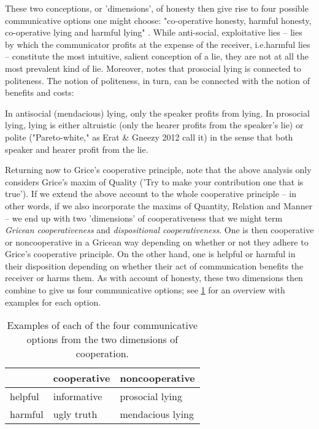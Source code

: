 These two conceptions, or 'dimensions', of honesty then give rise to four possible communicative options one might choose: "co-operative honesty, harmful honesty, co-operative lying and harmful lying" \citep[p.~45]{Dor17}.
While anti-social, exploitative lies -- lies by which the communicator profits at the expense of the receiver, i.e.\@ harmful lies -- constitute the most intuitive, salient conception of a lie, they are not at all the most prevalent kind of lie. Moreover, \citet{Meibauer18} notes that prosocial lying is connected to politeness. The notion of politeness, in turn, can be connected with the notion of benefits and costs:
\begin{quoting}
    In antisocial (mendacious) lying, only the speaker profits from lying. In prosocial lying, lying is either altruistic (only the hearer profits from the speaker's lie) or polite ("Pareto-white," as Erat \& Gneezy 2012 call it) in the sense that both speaker and hearer profit from the lie.
    \hfill \citep[p.~371]{Meibauer18}
\end{quoting}

Returning now to Grice's cooperative principle, note that the above analysis only considers Grice's maxim of Quality ('Try to make your contribution one that is true'). If we extend the above account to the whole cooperative principle -- in other words, if we also incorporate the maxims of Quantity, Relation and Manner -- we end up with two 'dimensions' of cooperativeness that we might term \emph{Gricean cooperativeness} and \emph{dispositional cooperativeness}. One is then cooperative or noncooperative in a Gricean way depending on whether or not they adhere to Grice's cooperative principle. On the other hand, one is helpful or harmful in their disposition depending on whether their act of communication benefits the receiver or harms them.
As with  account of honesty,
these two dimensions then combine to give us four communicative options; see \cref{tab:dimensions-of-cooperation} for an overview with examples for each option.

\begin{table}[ht]
  \centering
\begin{tabular}{|l|l|l|}
  \hline
    & cooperative & noncooperative \\ \hline
  helpful & informative & prosocial lying \\ \hline
  harmful & ugly truth & mendacious lying \\ \hline
\end{tabular}
\caption{Examples of each of the four communicative options from the two dimensions of cooperation.}
\label{tab:dimensions-of-cooperation}
\end{table}

